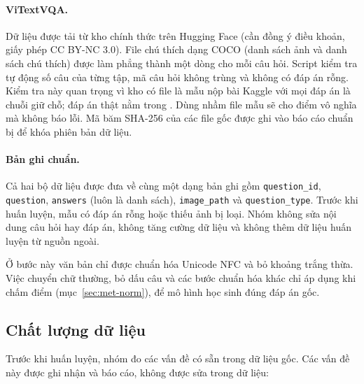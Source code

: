\paragraph{ViTextVQA.} Dữ liệu được tải từ kho chính thức trên Hugging Face (cần
đồng ý điều khoản, giấy phép CC BY-NC 3.0). File chú thích dạng COCO (danh sách
ảnh và danh sách chú thích) được làm phẳng thành một dòng cho mỗi câu hỏi. Script
kiểm tra tự động số câu của từng tập, mã câu hỏi không trùng và không có đáp án
rỗng. Kiểm tra này quan trọng vì kho có file  là mẫu
nộp bài Kaggle với mọi đáp án là chuỗi giữ chỗ; đáp án thật nằm trong
. Dùng nhầm file mẫu sẽ cho điểm vô nghĩa mà không
báo lỗi. Mã băm SHA-256 của các file gốc được ghi vào báo cáo chuẩn bị để khóa
phiên bản dữ liệu.

\paragraph{Bản ghi chuẩn.} Cả hai bộ dữ liệu được đưa về cùng một dạng bản ghi
gồm \texttt{question\_id}, \texttt{question}, \texttt{answers} (luôn là danh
sách), \texttt{image\_path} và \texttt{question\_type}. Trước khi huấn luyện, mẫu
có đáp án rỗng hoặc thiếu ảnh bị loại. Nhóm không sửa nội dung câu hỏi hay đáp
án, không tăng cường dữ liệu và không thêm dữ liệu huấn luyện từ nguồn ngoài.

Ở bước này văn bản chỉ được chuẩn hóa Unicode NFC và bỏ khoảng trắng thừa. Việc
chuyển chữ thường, bỏ dấu câu và các bước chuẩn hóa khác chỉ áp dụng khi chấm
điểm (mục~\ref{sec:met-norm}), để mô hình học sinh đúng đáp án gốc.

\subsection{Chất lượng dữ liệu}
\label{sec:met-quality}

Trước khi huấn luyện, nhóm đo các vấn đề có sẵn trong dữ liệu gốc. Các vấn đề này
được ghi nhận và báo cáo, không được sửa trong dữ liệu:

